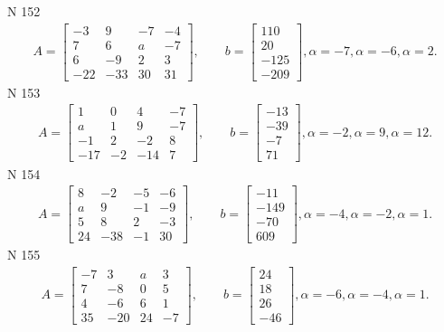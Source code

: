 \documentclass[11pt]{report}
\begin{document}
N 152
\begin{align*}
 A = \left[\begin{matrix}-3 & 9 & -7 & -4\\7 & 6 & a & -7\\6 & -9 & 2 & 3\\-22 & -33 & 30 & 31\end{matrix}\right],
    \qquad b = \left[\begin{matrix}110\\20\\-125\\-209\end{matrix}\right], \alpha = -7, \alpha = -6, \alpha = 2. 
 \end{align*}
N 153
\begin{align*}
 A = \left[\begin{matrix}1 & 0 & 4 & -7\\a & 1 & 9 & -7\\-1 & 2 & -2 & 8\\-17 & -2 & -14 & 7\end{matrix}\right],
    \qquad b = \left[\begin{matrix}-13\\-39\\-7\\71\end{matrix}\right], \alpha = -2, \alpha = 9, \alpha = 12. 
 \end{align*}
N 154
\begin{align*}
 A = \left[\begin{matrix}8 & -2 & -5 & -6\\a & 9 & -1 & -9\\5 & 8 & 2 & -3\\24 & -38 & -1 & 30\end{matrix}\right],
    \qquad b = \left[\begin{matrix}-11\\-149\\-70\\609\end{matrix}\right], \alpha = -4, \alpha = -2, \alpha = 1. 
 \end{align*}
N 155
\begin{align*}
 A = \left[\begin{matrix}-7 & 3 & a & 3\\7 & -8 & 0 & 5\\4 & -6 & 6 & 1\\35 & -20 & 24 & -7\end{matrix}\right],
    \qquad b = \left[\begin{matrix}24\\18\\26\\-46\end{matrix}\right], \alpha = -6, \alpha = -4, \alpha = 1. 
 \end{align*}
\end{document}
